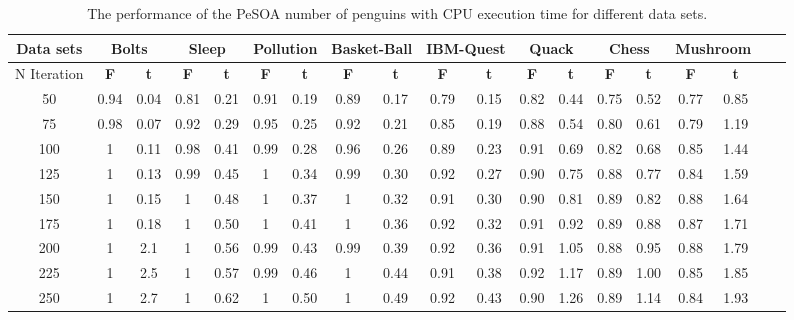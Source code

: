 \documentclass[preprint,12pt]{elsarticle}
\begin{document}
\begin{landscape}

\begin{table}[b]
\renewcommand{\arraystretch}{1.3}
\small
\caption{The performance of the PeSOA number of penguins with CPU execution time for different data sets.}
\label{sample-table1}
\begin{tabular}{c c c  c c c c c c c c c c c c c c c c}
\toprule
\textbf{Data sets} &  \multicolumn{2}{c}{Bolts} & \multicolumn{2}{c}{Sleep} & \multicolumn{2}{c}{Pollution}& \multicolumn{2}{c}{Basket-Ball}& \multicolumn{2}{c}{IBM-Quest}& \multicolumn{2}{c}{Quack}& \multicolumn{2}{c}{Chess}& \multicolumn{2}{c}{Mushroom}\\
\midrule
{N Iteration}   & \textbf{F}  & \textbf{t}  & \textbf{F}  & \textbf{t} & \textbf{F}  & \textbf{t} & \textbf{F}  & \textbf{t} & \textbf{F}  & \textbf{t} & \textbf{F}  & \textbf{t} & \textbf{F}  & \textbf{t} & \textbf{F}  & \textbf{t} \\\hline
50		&	  0.94 & 0.04 &	0.81 & 0.21		&		0.91 & 	0.19 	&		0.89 & 0.17	  	&	 0.79 &	0.15	&  0.82 & 0.44  &	0.75 &	0.52  &	0.77 & 	0.85 \\\hline
75		&		0.98 & 0.07 &	0.92 & 0.29 	&		0.95 & 	0.25 	&		0.92 & 0.21	  	&	 0.85 & 0.19	&  0.88 & 0.54  &	0.80 &	0.61  &	0.79 &	1.19  \\\hline
100		&		1    & 0.11	&	0.98 & 0.41 	&		0.99 & 	0.28	&		0.96 & 0.26			&	 0.89 &	0.23	&  0.91 & 0.69  &	0.82 &	0.68  &	0.85 &	1.44   \\\hline
125		&		1    & 0.13	&	0.99 & 0.45 	&		1    & 	0.34	&		0.99 & 0.30			&	 0.92 &	0.27  &  0.90 & 0.75  &	0.88 &  0.77  &	0.84 & 	1.59  \\\hline
150		&	  1    & 0.15	&	1    & 0.48 	&		1    & 	0.37	&		1    & 0.32			&	 0.91 &	0.30  &  0.90 & 0.81  &	0.89 &  0.82  &	0.88 & 	1.64 \\\hline
175		&		1    & 0.18	&	1    & 0.50	  &		1    & 	0.41	&		1    & 0.36		  &	 0.92 &	0.32  &  0.91 & 0.92  &	0.89 &  0.88  & 0.87& 	1.71 \\\hline
200		&		1    & 2.1	&	1    & 0.56 	&		0.99 & 	0.43	&		0.99 & 0.39			&	 0.92 &	0.36  &  0.91 & 1.05  &	0.88 &	0.95  &	0.88 & 	1.79 \\\hline
225		&		1    & 2.5  &	1    & 0.57 	&		0.99 & 	0.46	&		1    & 0.44	  	&	 0.91 &	0.38  &  0.92 & 1.17  &	0.89 &	1.00  &	0.85 & 	1.85 \\\hline
250		&		1    & 2.7	&	1    & 0.62 	&		1    & 	0.50	&		1    & 0.49			&	 0.92 &	0.43  &  0.90 & 1.26  &	0.89 &	1.14  &	0.84 & 	1.93 \\\hline

\end{tabular}
\end{table}
\end{landscape}
\end{document}
